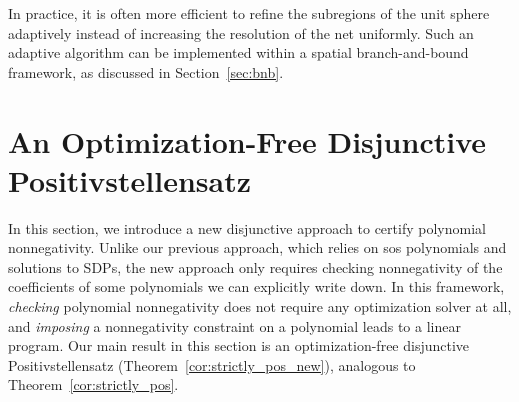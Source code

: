 \documentclass[12pt]{article}
\newcommand{\mcN}{\mathcal{N}}
\theoremstyle{remark}
\newtheorem{remark}{Remark}%
\begin{document}

In practice, it is often more efficient to refine the subregions of the unit sphere adaptively instead of increasing the resolution of the net uniformly. Such an adaptive algorithm can be implemented within a spatial branch-and-bound framework, as discussed in Section~\ref{sec:bnb}.

\section{An Optimization-Free Disjunctive Positivstellensatz}\label{sec:disos_new}
In this section, we introduce a new disjunctive approach to certify polynomial nonnegativity. Unlike our previous approach, which relies on sos polynomials and {solutions} to SDPs, the new approach only requires checking nonnegativity of the coefficients of some polynomials we can explicitly write down. In this framework, \emph{checking} polynomial nonnegativity does not require any optimization solver at all, and \emph{imposing} a nonnegativity constraint on a polynomial leads to a linear program. Our main result in this section is an optimization-free disjunctive Positivstellensatz (Theorem~\ref{cor:strictly_pos_new}), analogous to Theorem~\ref{cor:strictly_pos}. 
\end{document}
